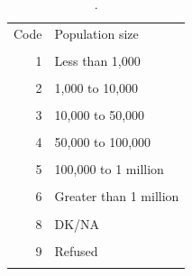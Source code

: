 \begin{table}[htbp]\centering
\caption{.}
\label{tab:population_labels}
\begin{tabular}{rl}\toprule
Code & Population size \\\\ \midrule
1 & Less than 1,000 \\\\
2 & 1,000 to 10,000 \\\\
3 & 10,000 to 50,000 \\\\
4 & 50,000 to 100,000 \\\\
5 & 100,000 to 1 million \\\\
6 & Greater than 1 million \\\\
8 & DK/NA \\\\
9 & Refused \\\\
\bottomrule\end{tabular}\end{table}
